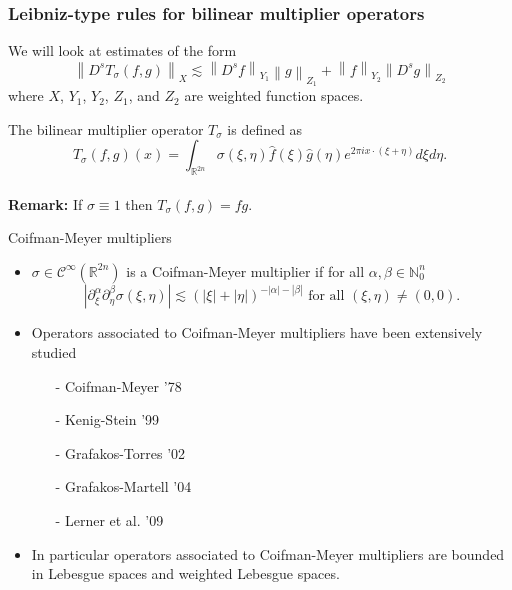 \documentclass[xcolor=dvipsnames]{beamer}
\newcommand{\norm}[2]{{\left\| #1 \right\|}_{#2}}
\begin{document}
\begin{frame}\frametitle{Leibniz-type rules for bilinear multiplier operators}


 We will look at estimates of the form
\[ \norm{D^sT_\sigma(f,g)}{X} \lesssim \norm{D^sf}{Y_1}\norm{g}{Z_1}+\norm{f}{Y_2}\norm{D^sg}{Z_2} \]
where $X$, $Y_1$, $Y_2$, $Z_1$, and $Z_2$ are weighted function spaces.

\vspace{8mm}
The bilinear multiplier operator $T_\sigma$ is defined as
 \[T_\sigma(f,g)(x) = \int_{\mathbb{R}^{2n}} \sigma(\xi,\eta) \widehat{f}(\xi)\widehat{g}(\eta) e^{2\pi i x\cdot (\xi + \eta)} d\xi d\eta.\]
 \\
\vspace{8mm}
\textbf{Remark:} If $\sigma \equiv 1$ then $T_\sigma(f,g) = fg.$


\end{frame}

\begin{frame}{Coifman-Meyer multipliers}
\begin{itemize}
\item $\sigma \in \mathcal{C}^\infty(\mathbb{R}^{2n})$ is a Coifman-Meyer multiplier if for all $\alpha,\beta \in \mathbb{N}^n_0$ 
\[ |\partial^\alpha_\xi \partial^\beta_\eta \sigma(\xi,\eta)| \lesssim (|\xi| + |\eta|)^{-|\alpha| - |\beta|} \text{ for all } (\xi,\eta)\neq (0,0). \]

\bigskip
\item Operators associated to Coifman-Meyer multipliers have been extensively studied
\begin{enumerate}[-]
\item[-] Coifman-Meyer '78
\item[-] Kenig-Stein '99
\item[-] Grafakos-Torres '02
\item[-] Grafakos-Martell '04
\item[-]Lerner et al. '09

\end{enumerate}

\bigskip

\item In particular operators associated to Coifman-Meyer multipliers are bounded in Lebesgue spaces and weighted Lebesgue spaces.
\end{itemize}

\end{frame}
\end{document}
